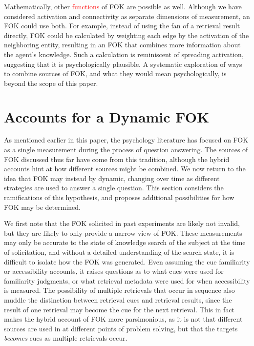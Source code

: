 \documentclass[10pt,letterpaper]{article}
\newcommand{\fixme}[2][]{#2}
\renewcommand{\fixme}[2][]{\textcolor{red}{#2}}
\begin{document}
Mathematically, other \fixme{functions} of FOK are possible as well.
Although we have considered activation and connectivity as separate dimensions of measurement, an FOK could use both.
For example, instead of using the fan of a retrieval result directly, FOK could be calculated by weighting each edge by the activation of the neighboring entity, resulting in an FOK that combines more information about the agent's knowledge.
Such a calculation is reminiscent of spreading activation, suggesting that it is psychologically plausible.
A systematic exploration of ways to combine sources of FOK, and what they would mean psychologically, is beyond the scope of this paper.

\section{Accounts for a Dynamic FOK}

As mentioned earlier in this paper, the psychology literature has focused on FOK as a single measurement during the process of question answering.
The sources of FOK discussed thus far have come from this tradition, although the hybrid accounts hint at how different sources might be combined. 
We now return to the idea that FOK may instead by dynamic, changing over time as different strategies are used to answer a single question.
This section considers the ramifications of this hypothesis, and proposes additional possibilities for how FOK may be determined.

We first note that the FOK solicited in past experiments are likely not invalid, but they are likely to only provide a narrow view of FOK.
These measurements may only be accurate to the state of knowledge search of the subject at the time of solicitation, and without a detailed understanding of the search state, it is difficult to isolate how the FOK was generated.
Even assuming the cue familiarity or accessibility accounts, it raises questions as to what cues were used for familiarity judgments, or what retrieval metadata were used for when accessibility is measured.
The possibility of multiple retrievals that occur in sequence also muddle the distinction between retrieval cues and retrieval results, since the result of one retrieval may become the cue for the next retrieval.
This in fact makes the hybrid account of FOK more parsimonious, as it is not that different sources are used in at different points of problem solving, but that the targets \textit{becomes} cues as multiple retrievals occur.
\end{document}
